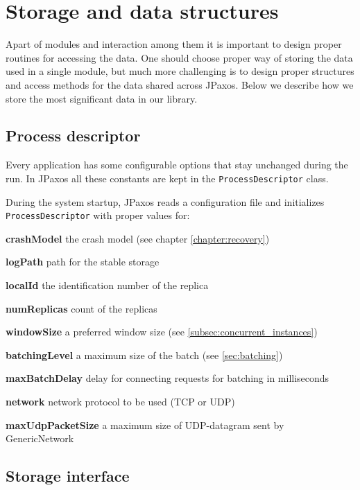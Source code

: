 \section{Storage and data structures}
\label{sec:storage_and_data_structures}

Apart of modules and interaction among them it is important to design proper routines for accessing the data.
One should choose proper way of storing the data used in a single module, but much more challenging is to design proper structures and access methods for the data shared across JPaxos. Below we describe how we store the most significant data in our library.

\subsection{Process descriptor}

Every application has some configurable options that stay unchanged during the run. In JPaxos all these constants are kept in the \texttt{ProcessDescriptor} class.

During the system startup, JPaxos reads a configuration file and initializes \texttt{ProcessDescriptor} with proper values for:
\begin{tightList}[\setlength{\labelwidth}{0em}]
 \item[\textbf{crashModel}] the crash model (see chapter \ref{chapter:recovery})
 \item[\textbf{logPath}] path for the stable storage
 \item[\textbf{localId}] the identification number of the replica
 \item[\textbf{numReplicas}] count of the replicas
 \item[\textbf{windowSize}] a preferred window size (see \ref{subsec:concurrent_instances})
 \item[\textbf{batchingLevel}] a maximum size of the batch (see \ref{sec:batching})
 \item[\textbf{maxBatchDelay}] delay for connecting requests for batching in milliseconds
 \item[\textbf{network}] network protocol to be used (TCP or UDP)
 \item[\textbf{maxUdpPacketSize}] a maximum size of UDP-datagram sent by GenericNetwork
\end{tightList}

\subsection{Storage interface}
\label{subsec:storage_interface}

